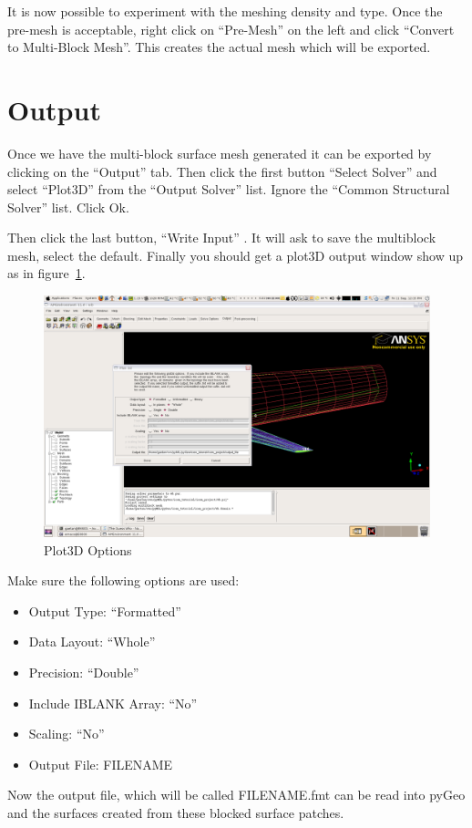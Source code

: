 \documentclass{report}
\begin{document}
It is now possible to experiment with the meshing density and type. Once the pre-mesh is acceptable, right click on ``Pre-Mesh'' on the left and click ``Convert to Multi-Block Mesh''.  This creates the actual mesh which will be exported.

\section{Output}

Once we have the multi-block surface mesh generated it can be exported by clicking on the ``Output'' tab. Then click the first button ``Select Solver'' and select ``Plot3D'' from the ``Output Solver'' list. Ignore the ``Common Structural Solver'' list. Click Ok.

Then click the last button, ``Write Input'' . It will ask to save the multiblock mesh, select the default. Finally you should get a plot3D output window show up as in figure~\ref{fig:plot3d_output}.

\begin{figure}[htb]
  \centering
  \includegraphics[width=\textwidth,angle=0]{figures/fig17.png}
  \caption{Plot3D Options}
  \label{fig:plot3d_output}
\end{figure}

Make sure the following options are used:
\begin{itemize}
\item Output Type: ``Formatted''
\item Data Layout: ``Whole''
\item Precision: ``Double''
\item Include IBLANK Array: ``No''
\item Scaling: ``No''
\item Output File: FILENAME
\end{itemize}

Now the output file, which will be called FILENAME.fmt can be read into pyGeo and the surfaces created from these blocked surface patches. 
\end{document}

